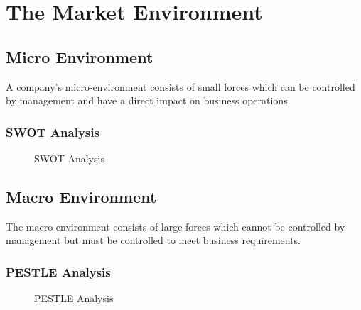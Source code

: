 \chapter{The Market Environment}\label{chap:the_market_environment}

  \section{Micro Environment}\label{sec:micro_environment}

    A company's micro-environment consists of small forces which can be controlled by management and have a direct impact on business operations.

    \subsection{SWOT Analysis}\label{subsec:swot_analysis}

      \begin{figure}
        \centering
        \begin{minipage}{14cm}
          \centering
          
          \caption{SWOT Analysis}
          \label{fig:swot}
        \end{minipage}
      \end{figure}

  \section{Macro Environment}\label{sec:macro_environment}

    The macro-environment consists of large forces which cannot be controlled by management but must be controlled to meet business requirements.

    \subsection{PESTLE Analysis}\label{subsec:pestle_analysis}

      \begin{figure}
        \centering
        \begin{minipage}{14cm}
          \centering
          
          \caption{PESTLE Analysis}
          \label{fig:swot}
        \end{minipage}
      \end{figure}
